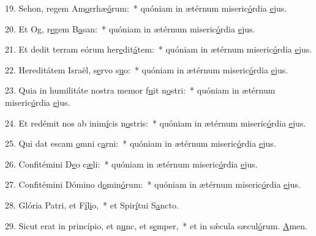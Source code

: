 19. Sehon, regem Am\uline{o}rrhæ\uline{ó}rum:~* quóniam in ætérnum miseric\uline{ó}rdia \uline{e}jus.\par 
20. Et Og, r\uline{e}gem B\uline{a}san:~* quóniam in ætérnum miseric\uline{ó}rdia \uline{e}jus.\par 
21. Et dedit terram eórum her\uline{e}dit\uline{á}tem:~* quóniam in ætérnum miseric\uline{ó}rdia \uline{e}jus.\par 
22. Hereditátem Israël, s\uline{e}rvo s\uline{u}o:~* quóniam in ætérnum miseric\uline{ó}rdia \uline{e}jus.\par 
23. Quia in humilitáte nostra memor f\uline{u}it n\uline{o}stri:~* quóniam in ætérnum miseric\uline{ó}rdia \uline{e}jus.\par 
24. Et redémit nos ab inim\uline{í}cis n\uline{o}stris:~* quóniam in ætérnum miseric\uline{ó}rdia \uline{e}jus.\par 
25. Qui dat escam \uline{o}mni c\uline{a}rni:~* quóniam in ætérnum miseric\uline{ó}rdia \uline{e}jus.\par 
26. Confitémini D\uline{e}o c\uline{æ}li:~* quóniam in ætérnum miseric\uline{ó}rdia \uline{e}jus.\par 
27. Confitémini Dómino d\uline{o}min\uline{ó}rum:~* quóniam in ætérnum miseric\uline{ó}rdia \uline{e}jus.\par 
28. Glória Patri, et F\uline{í}l\uline{i}o,~* et Spir\uline{í}tui S\uline{a}ncto.\par 
29. Sicut erat in princípio, et n\uline{u}nc, et s\uline{e}mper,~* et in sǽcula sæcul\uline{ó}rum. \uline{A}men.\par 
